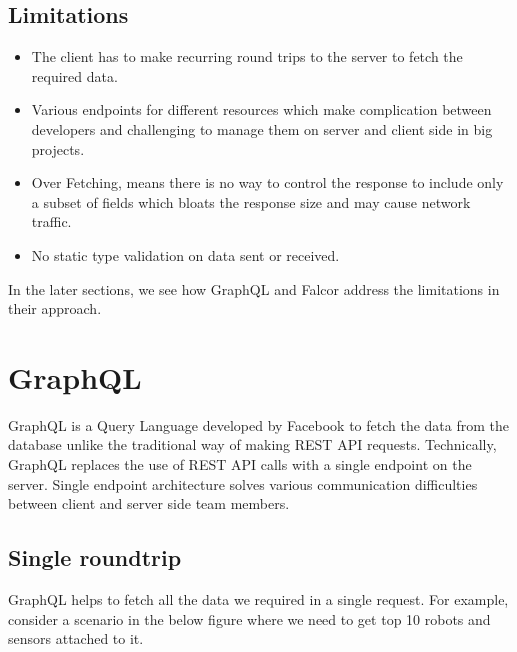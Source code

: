 	\newpage
	\subsection{Limitations}
	\begin{itemize}
		\item The client has to make recurring round trips to the server to fetch the required data.
		\item Various endpoints for different resources which make complication between developers and challenging to manage them on server and client side in big projects.
		\item Over Fetching, means there is no way to control the response to include only a subset of fields which bloats the response size and may cause network traffic.
		\item No static type validation on data sent or received.		
	\end{itemize}

	In the later sections, we see how GraphQL and Falcor address the limitations in their approach.
	
	\section{GraphQL}
	GraphQL is a Query Language developed by Facebook to fetch the data from the database unlike the traditional way of making REST API requests. Technically, GraphQL replaces the use of REST API calls with a single endpoint on the server. Single endpoint architecture solves various communication difficulties between client and server side team members. 
	
	\subsection{Single roundtrip}
	GraphQL helps to fetch all the data we required in a single request. For example, consider a scenario in the below figure where we need to get top 10 robots and sensors attached to it. 
	
